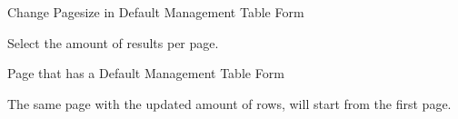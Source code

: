 
\begin{uc}{Change Pagesize in Default Management Table Form}

    \begin{uc-mss}
    	\item Select the amount of results per page.
    \end{uc-mss}

    \begin{uc-pre}
    \item Page that has a Default Management Table Form
    \end{uc-pre}

    \begin{uc-post}
    \item The same page with the updated amount of rows, will start from the first page.
    \end{uc-post}

\end{uc}

